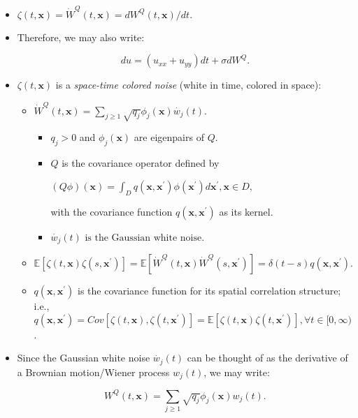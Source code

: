 \documentclass[
]{article}
\begin{document}
\begin{itemize}
\item
  \(\zeta(t,\mathbf{x})=\dot{W}^{Q}(t,\mathbf{x}) =dW^{Q}(t, \mathbf{x}) /dt.\)
\item
  Therefore, we may also write:

  \begin{equation}
  du=(u_{xx}+u_{yy}) dt+\sigma dW^Q. \label{spde}
  \end{equation}
\item
  \(\zeta(t,\mathbf{x})\) is a \emph{space-time colored noise} (white in
  time, colored in space):

  \begin{itemize}
  \item
    \(\displaystyle \dot{W}^{Q}(t, \mathbf{x})= \sum_{j\ge1}\sqrt{q_j} \phi_j(\mathbf{x})\dot{w_j}(t).\)

    \begin{itemize}
    \item
      \(q_j>0\) and \(\phi_j(\mathbf{x})\) are eigenpairs of \(Q\).
    \item
      \(Q\) is the covariance operator defined by

      \(\displaystyle (Q\phi)(\mathbf{x})=\int_{D}q(\mathbf{x},\mathbf{x}^{\prime})\phi(\mathbf{x}^{\prime})d\mathbf{x}^{\prime}, \mathbf{x}\in D,\)

      with the covariance function \(q(\mathbf{x},\mathbf{x}^{\prime})\)
      as its kernel.
    \item
      \(\dot{w_j}(t) \text{ is the Gaussian white noise.}\)
    \end{itemize}
  \item
    \(\mathbb{E}\left[\zeta(t,\mathbf{x}) \zeta(s,\mathbf{x}^{\prime})\right]=\mathbb{E}\left[\dot{W}^{Q}(t, \mathbf{x}) \dot{W}^{Q}(s,\mathbf{x}^{\prime})\right]=\delta(t-s) q(\mathbf{x},\mathbf{x}^{\prime}).\)
  \item
    \(q(\mathbf{x},\mathbf{x}^{\prime})\) is the covariance function for
    its spatial correlation structure; i.e.,
    \(q(\mathbf{x},\mathbf{x}^{\prime})=Cov[\zeta(t,\mathbf{x}),\zeta(t,\mathbf{x}^{\prime})]=\mathbb{E}\left[\zeta(t,\mathbf{x}) \zeta(t,\mathbf{x}^{\prime})\right], \forall t \in [0,\infty)\).
  \end{itemize}
\item
  Since the Gaussian white noise \(\dot{w_j}(t)\) can be thought of as
  the derivative of a Brownian motion/Wiener process \(w_j(t)\), we may
  write:

  \[\displaystyle W^{Q}(t, \mathbf{x})= \sum_{j\ge1}\sqrt{q_j} \phi_j(\mathbf{x})w_j(t). \label{Qwiener}\]


\end{itemize}
\end{document}
